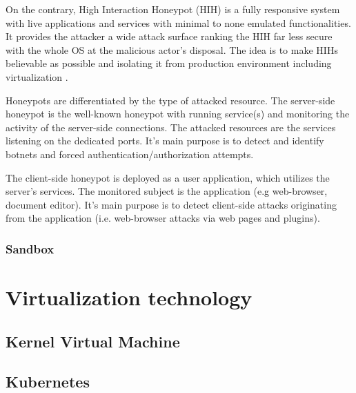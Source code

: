 On the contrary, High Interaction Honeypot (HIH) is a fully responsive system with live applications and services with minimal to none emulated functionalities. It provides the attacker a wide attack surface ranking the HIH far less secure with the whole OS at the malicious actor's disposal. The idea is to make HIHs believable as possible and isolating it from production environment including virtualization \cite{blog:first_malware_analysis}.\par

Honeypots are differentiated by the type of attacked resource. The server-side honeypot is the well-known honeypot with running service(s) and monitoring the activity of the server-side connections. The attacked resources are the services listening on the dedicated ports. It's main purpose is to detect and identify botnets and forced authentication/authorization attempts.\par

The client-side honeypot is deployed as a user application, which utilizes the server's services. The monitored subject is the application (e.g web-browser, document editor). It's main purpose is to detect client-side attacks originating from the application (i.e. web-browser attacks via web pages and plugins).\par



\subsubsection{Sandbox \label{anal:malware:mech_envs:sand}}

\section{Virtualization technology \label{anal:virtual}}

\subsection{Kernel Virtual Machine \label{anal:virtual:kvm}}

\subsection{Kubernetes \label{anal:virtual:k8s}}

